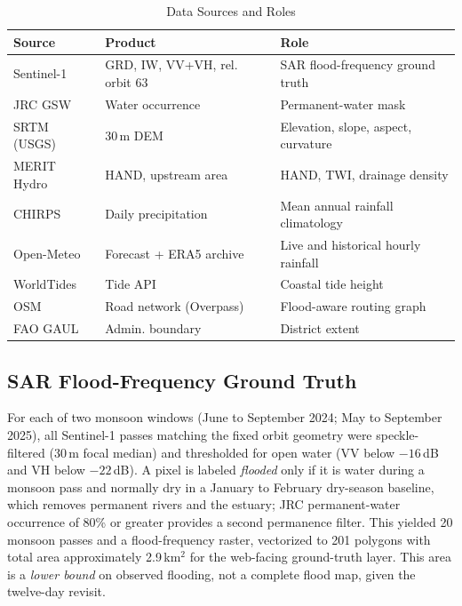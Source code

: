 \documentclass[conference]{IEEEtran}
\begin{document}
\begin{table}[t]
\caption{Data Sources and Roles}
\label{tab:data}
\centering
\footnotesize
\begin{tabular}{|p{1.4cm}|p{2.7cm}|p{3.0cm}|}
\hline
\textbf{Source} & \textbf{Product} & \textbf{Role} \\
\hline
Sentinel-1 & GRD, IW, VV+VH, rel. orbit 63 & SAR flood-frequency ground truth \\
\hline
JRC GSW \cite{pekel2016} & Water occurrence & Permanent-water mask \\
\hline
SRTM (USGS) & 30\,m DEM & Elevation, slope, aspect, curvature \\
\hline
MERIT Hydro \cite{yamazaki2019} & HAND, upstream area & HAND, TWI, drainage density \\
\hline
CHIRPS \cite{funk2015} & Daily precipitation & Mean annual rainfall climatology \\
\hline
Open-Meteo & Forecast + ERA5 archive & Live and historical hourly rainfall \\
\hline
WorldTides & Tide API & Coastal tide height \\
\hline
OSM & Road network (Overpass) & Flood-aware routing graph \\
\hline
FAO GAUL & Admin. boundary & District extent \\
\hline
\end{tabular}
\end{table}

\subsection{SAR Flood-Frequency Ground Truth}
For each of two monsoon windows (June to September 2024; May to September 2025), all Sentinel-1 passes matching the fixed orbit geometry were speckle-filtered (30\,m focal median) and thresholded for open water (VV below $-16$\,dB and VH below $-22$\,dB). A pixel is labeled \emph{flooded} only if it is water during a monsoon pass and normally dry in a January to February dry-season baseline, which removes permanent rivers and the estuary; JRC permanent-water occurrence of 80\% or greater provides a second permanence filter. This yielded 20 monsoon passes and a flood-frequency raster, vectorized to 201 polygons with total area approximately 2.9\,km$^2$ for the web-facing ground-truth layer. This area is a \emph{lower bound} on observed flooding, not a complete flood map, given the twelve-day revisit.
\end{document}
